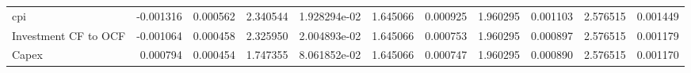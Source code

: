 \documentclass[12pt,a4paper,english]{article}
\begin{document}
{{\begin{tabular}{@{}lrrrrrrrrrr@{}}
			cpi                           & -0.001316                & 0.000562                    & 2.340544                  & 1.928294e-02                             & 1.645066                      & 0.000925                      & 1.960295                     & 0.001103                     & 2.576515                     & 0.001449                     \\
			Investment CF to OCF          & -0.001064                & 0.000458                    & 2.325950                  & 2.004893e-02                             & 1.645066                      & 0.000753                      & 1.960295                     & 0.000897                     & 2.576515                     & 0.001179                     \\
			Capex                         & 0.000794                 & 0.000454                    & 1.747355                  & 8.061852e-02                             & 1.645066                      & 0.000747                      & 1.960295                     & 0.000890                     & 2.576515                     & 0.001170                     \\ \bottomrule
		\end{tabular}%
	}
}
\end{document}
